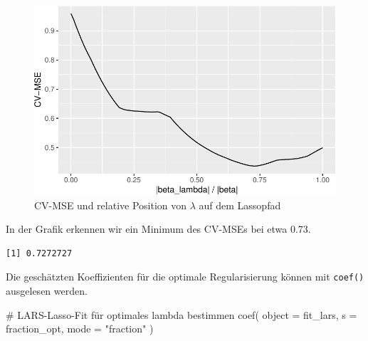 \documentclass[
  a4paper,
  DIV=11,
  oneside]{scrreprt}
\newenvironment{Shaded}{\begin{snugshade}}{\end{snugshade}}
\newcommand{\AttributeTok}[1]{\textcolor[rgb]{0.40,0.45,0.13}{#1}}
\newcommand{\CommentTok}[1]{\textcolor[rgb]{0.37,0.37,0.37}{#1}}
\newcommand{\FunctionTok}[1]{\textcolor[rgb]{0.28,0.35,0.67}{#1}}
\newcommand{\NormalTok}[1]{\textcolor[rgb]{0.00,0.23,0.31}{#1}}
\newcommand{\OtherTok}[1]{\textcolor[rgb]{0.00,0.23,0.31}{#1}}
\newcommand{\SpecialCharTok}[1]{\textcolor[rgb]{0.37,0.37,0.37}{#1}}
\newcommand{\StringTok}[1]{\textcolor[rgb]{0.13,0.47,0.30}{#1}}
\begin{document}
\begin{figure}[t]

{\centering \includegraphics{RegReg_files/figure-pdf/fig-larscv-1.pdf}

}

\caption{\label{fig-larscv}CV-MSE und relative Position von \(\lambda\)
auf dem Lassopfad}

\end{figure}

In der Grafik erkennen wir ein Minimum des CV-MSEs bei etwa 0.73.

\begin{Shaded}
\end{Shaded}

\begin{verbatim}
[1] 0.7272727
\end{verbatim}

Die geschätzten Koeffizienten für die optimale Regularisierung können
mit \texttt{coef()} ausgelesen werden.

\begin{Shaded}
\begin{Highlighting}[]
\CommentTok{\# LARS{-}Lasso{-}Fit für optimales lambda bestimmen}
\FunctionTok{coef}\NormalTok{(}
  \AttributeTok{object =}\NormalTok{ fit\_lars, }
  \AttributeTok{s =}\NormalTok{ fraction\_opt, }
  \AttributeTok{mode =} \StringTok{"fraction"}
\NormalTok{)}
\end{Highlighting}
\end{Shaded}
\end{document}
